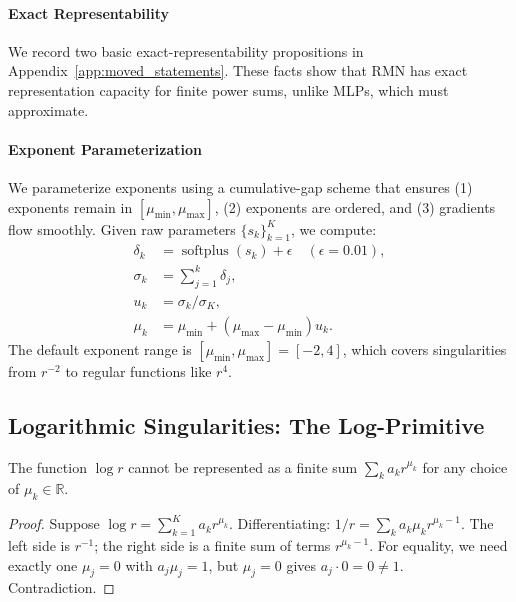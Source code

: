 \documentclass[twoside,11pt]{article}
\newcommand{\R}{\mathbb{R}}
\DeclareMathOperator{\softplus}{softplus}
\begin{document}
\paragraph{Exact Representability} We record two basic exact-representability propositions in Appendix~\ref{app:moved_statements}. These facts show that RMN has exact representation capacity for finite power sums, unlike MLPs, which must approximate.

\paragraph{Exponent Parameterization} We parameterize exponents using a cumulative-gap scheme that ensures (1) exponents remain in $[\mu_{\min}, \mu_{\max}]$, (2) exponents are ordered, and (3) gradients flow smoothly. Given raw parameters $\{s_k\}_{k=1}^K$, we compute:
\begin{align}
	\delta_k & = \softplus(s_k) + \epsilon \quad (\epsilon = 0.01), \\
	\sigma_k & = \sum_{j=1}^k \delta_j,                             \\
	u_k      & = \sigma_k / \sigma_K,                               \\
	\mu_k    & = \mu_{\min} + (\mu_{\max} - \mu_{\min}) u_k.
\end{align}
The default exponent range is $[\mu_{\min}, \mu_{\max}] = [-2, 4]$, which covers singularities from $r^{-2}$ to regular functions like $r^4$.

\subsection{Logarithmic Singularities: The Log-Primitive}
\label{subsec:log_treatment}

\begin{proposition}
	\label{prop:log_not_power}
	The function $\log r$ cannot be represented as a finite sum $\sum_k a_k r^{\mu_k}$ for any choice of $\mu_k \in \R$.
\end{proposition}

\begin{proof}
	Suppose $\log r = \sum_{k=1}^K a_k r^{\mu_k}$. Differentiating: $1/r = \sum_k a_k \mu_k r^{\mu_k - 1}$. The left side is $r^{-1}$; the right side is a finite sum of terms $r^{\mu_k - 1}$. For equality, we need exactly one $\mu_j = 0$ with $a_j \mu_j = 1$, but $\mu_j = 0$ gives $a_j \cdot 0 = 0 \neq 1$. Contradiction.
\end{proof}
\end{document}
